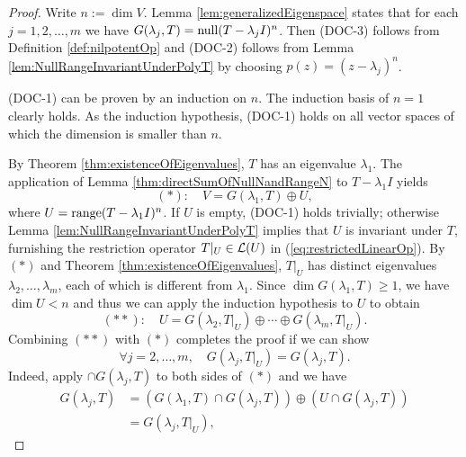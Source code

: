 \begin{proof}
  Write $n:=\dim V$. 
  Lemma \ref{lem:generalizedEigenspace} states that
  for each $j=1, 2, \ldots, m$
  we have $G(\lambda_j, T) = \mathrm{null}(T-\lambda_j I)^{n}$.
  Then (DOC-3) follows from Definition \ref{def:nilpotentOp}
  and (DOC-2) follows from Lemma \ref{lem:NullRangeInvariantUnderPolyT}
  by choosing $p(z)=(z-\lambda_j)^n$.
  
  (DOC-1) can be proven by an induction on $n$.
  The induction basis of $n=1$ clearly holds.
  As the induction hypothesis, (DOC-1) holds
  on all vector spaces of which the dimension
  is smaller than $n$.%

  By Theorem \ref{thm:existenceOfEigenvalues},
  $T$ has an eigenvalue $\lambda_1$.
  The application of Lemma \ref{thm:directSumOfNullNandRangeN}
  to $T-\lambda_1 I$ yields
  \begin{displaymath}
    (*):\quad V = G(\lambda_1, T) \oplus U,
  \end{displaymath}
  where $U=\mathrm{range}(T-\lambda_1I)^n$.
  If $U$ is empty, \mbox{(DOC-1)} holds trivially; 
  otherwise Lemma \ref{lem:NullRangeInvariantUnderPolyT} implies that
  $U$ is invariant under $T$,
  furnishing the restriction operator \mbox{$T|_U\in{\cal L}(U)$}
  in (\ref{eq:restrictedLinearOp}).
  By $(*)$ and Theorem \ref{thm:existenceOfEigenvalues},
  $T|_U$ has distinct eigenvalues $\lambda_2,\ldots,\lambda_m$,
  each of which is different from $\lambda_1$.
  Since $\dim G(\lambda_1,T)\ge 1$,
  we have $\dim U<n$
  and thus we can apply the induction hypothesis to $U$
  to obtain
  \begin{displaymath}
    (**):\quad
    U = G(\lambda_2,T|_U)\oplus \cdots \oplus G(\lambda_m, T|_U).
  \end{displaymath}
  Combining $(**)$ with $(*)$
  completes the proof if we can show
  \begin{displaymath}
    \forall j=2,\ldots,m,\quad
    G(\lambda_j,T|_U) = G(\lambda_j, T).
  \end{displaymath}
  Indeed, 
  apply $\cap G(\lambda_j, T)$ to both sides of $(*)$
  and we have
  \begin{displaymath}
    \begin{array}{rl}
      G(\lambda_j, T) &= (G(\lambda_1, T)\cap G(\lambda_j, T))\oplus
                        (U \cap G(\lambda_j, T))
                        \\ &= G(\lambda_j,T|_U), 
    \end{array}
  \end{displaymath}

\end{proof}
